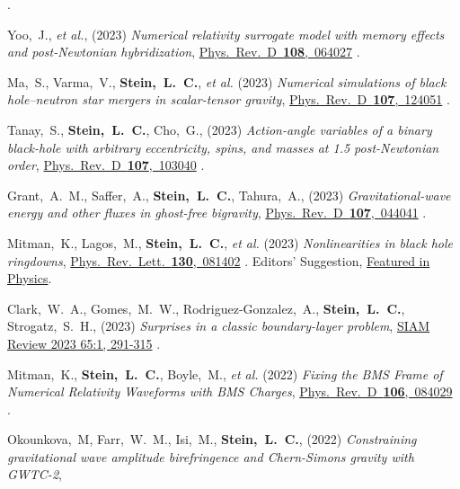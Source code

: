 \begin{etaremune}[start=\value{pubCounter}]
  .
\item
  Yoo,~J., {\it et al.},
  (2023)
  {\it Numerical relativity surrogate model with memory effects and post-Newtonian hybridization},
  \href{https://doi.org/10.1103/PhysRevD.108.064027}%
  {Phys.~Rev.~D~{\bf 108},~064027}
  .
\item
  Ma,~S.,
  Varma,~V.,
  {\bf Stein,~L.~C.},
  {\it et al.}
  (2023)
  {\it Numerical simulations of black hole--neutron star mergers in scalar-tensor gravity},
  \href{https://doi.org/10.1103/PhysRevD.107.124051}%
  {Phys.~Rev.~D~{\bf 107},~124051}
  .
\item
  Tanay,~S.,
  {\bf Stein,~L.~C.},
  Cho,~G.,
  (2023)
  {\it Action-angle variables of a binary black-hole with arbitrary eccentricity, spins, and masses at 1.5 post-Newtonian order},
  \href{https://doi.org/10.1103/PhysRevD.107.103040}%
  {Phys.~Rev.~D~{\bf 107},~103040}
  .
\item
  Grant,~A.~M.,
  Saffer,~A.,
  {\bf Stein,~L.~C.},
  Tahura,~A.,
  (2023)
  {\it Gravitational-wave energy and other fluxes in ghost-free bigravity},
  \href{https://doi.org/10.1103/PhysRevD.107.044041}%
  {Phys.~Rev.~D~{\bf 107},~044041}
  .
\item
  Mitman,~K.,
  Lagos,~M.,
  {\bf Stein,~L.~C.},
  {\it et al.}
  (2023)
  {\it Nonlinearities in black hole ringdowns},
  \href{https://doi.org/10.1103/PhysRevLett.130.081402}{Phys.~Rev.~Lett.~{\bf 130},~081402}
  .
  \raisebox{.15em}{\aldine} Editors' Suggestion,
  \href{https://physics.aps.org/articles/v16/29}{Featured in Physics}.
\item
  Clark,~W.~A.,
  Gomes,~M.~W.,
  Rodriguez-Gonzalez,~A.,
  {\bf Stein,~L.~C.},
  Strogatz,~S.~H.,
  (2023)
  {\it Surprises in a classic boundary-layer problem},
  \href{https://doi.org/10.1137/21M1436087}%
  {SIAM Review 2023 65:1, 291-315}
  .
\item
  Mitman,~K.,
  {\bf Stein,~L.~C.},
  Boyle,~M., {\it et al.}
  (2022)
  {\it Fixing the BMS Frame of Numerical Relativity Waveforms with BMS Charges},
  \href{https://doi.org/10.1103/PhysRevD.106.084029}%
  {Phys.~Rev.~D~{\bf 106},~084029}
  .
\item
  Okounkova,~M,
  Farr,~W.~M.,
  Isi,~M.,
  {\bf Stein,~L.~C.},
  (2022)
  {\it Constraining gravitational wave amplitude birefringence and Chern-Simons gravity with GWTC-2},

\end{etaremune}
